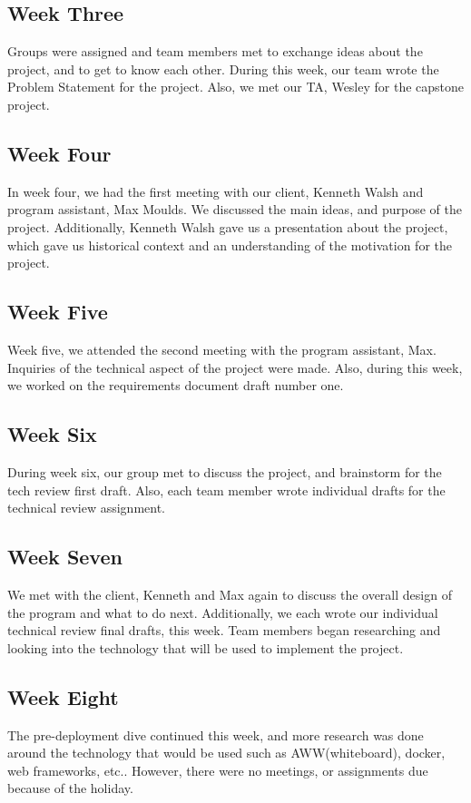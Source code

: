 \documentclass[onecolumn, draftclsnofoot,10pt, compsoc]{IEEEtran}
\begin{document}
\subsection{Week Three}
Groups were assigned and team members met to exchange ideas about the project, and to get to know each other. During this week, our team wrote the Problem Statement for the project. Also, we met our TA, Wesley for the capstone project.
\subsection{Week Four}
In week four, we had the first meeting with our client, Kenneth Walsh and program assistant, Max Moulds. We discussed the main ideas, and purpose of the project. Additionally, Kenneth Walsh gave us a presentation about the project, which gave us historical context and an understanding of the motivation for the project.
\subsection{Week Five}
Week five, we attended the second meeting with the program assistant, Max. Inquiries of the technical aspect of the project were made. Also, during this week, we worked on the requirements document draft number one.
\subsection{Week Six}
During week six, our group met to discuss the project, and brainstorm for the tech review first draft. Also, each team member wrote individual drafts for the technical review assignment.
\subsection{Week Seven}
We met with the client, Kenneth and Max again to discuss the overall design of the program and what to do next. Additionally, we each wrote our individual technical review final drafts, this week. Team members began researching and looking into the technology that will be used to implement the project.
\subsection{Week Eight}
The pre-deployment dive continued this week, and more research was done around the technology that would be used such as AWW(whiteboard), docker, web frameworks, etc.. However, there were no meetings, or assignments due because of the holiday.
\end{document}
